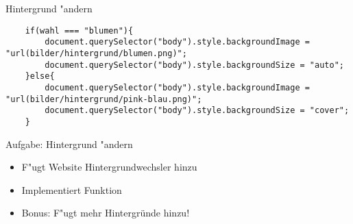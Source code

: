 \documentclass[18pt]{beamer}
\begin{document}
\begin{frame}[fragile]{Hintergrund "andern }
	\begin{lstlisting}
	if(wahl === "blumen"){
		document.querySelector("body").style.backgroundImage = "url(bilder/hintergrund/blumen.png)";
		document.querySelector("body").style.backgroundSize = "auto";
	}else{
		document.querySelector("body").style.backgroundImage = "url(bilder/hintergrund/pink-blau.png)";
		document.querySelector("body").style.backgroundSize = "cover";
	}
	\end{lstlisting}
\end{frame}


\begin{frame}[fragile]{Aufgabe: Hintergrund "andern }
\begin{itemize}
	\item F"ugt Website Hintergrundwechsler hinzu
	\item Implementiert Funktion
	\item Bonus: F"ugt mehr Hintergründe hinzu!
\end{itemize}
\end{frame}
\end{document}

